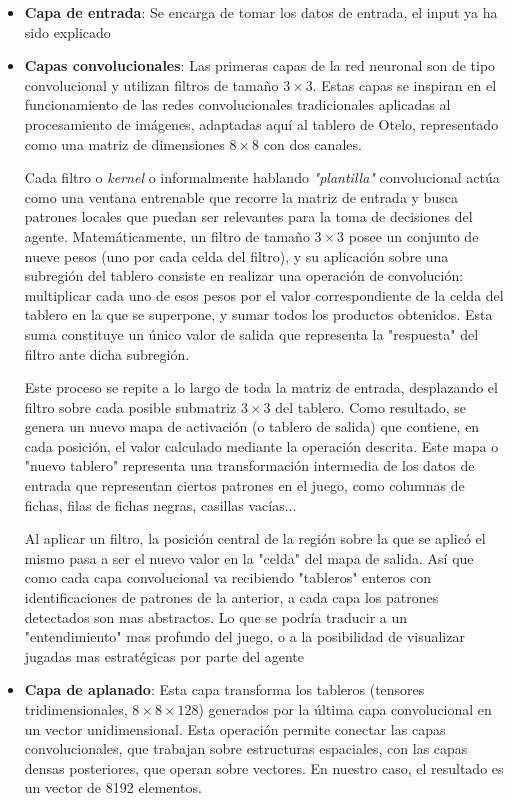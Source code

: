 \documentclass[conference]{IEEEtran}
\begin{document}
\begin{itemize}
    \item \textbf{Capa de entrada}: Se encarga de tomar los datos de entrada, el input ya ha sido explicado 
    \item \textbf{Capas convolucionales}: Las primeras capas de la red neuronal son de tipo convolucional y utilizan filtros de tamaño $3 \times 3$. Estas capas se inspiran en el funcionamiento de las redes convolucionales tradicionales aplicadas al procesamiento de imágenes, adaptadas aquí al tablero de Otelo, representado como una matriz de dimensiones $8 \times 8$ con dos canales.

Cada filtro o \textit{kernel} o informalmente hablando \textit{"plantilla"} convolucional actúa como una ventana entrenable que recorre la matriz de entrada y busca patrones locales que puedan ser relevantes para la toma de decisiones del agente. Matemáticamente, un filtro de tamaño $3 \times 3$ posee un conjunto de nueve pesos (uno por cada celda del filtro), y su aplicación sobre una subregión del tablero consiste en realizar una operación de convolución: multiplicar cada uno de esos pesos por el valor correspondiente de la celda del tablero en la que se superpone, y sumar todos los productos obtenidos. Esta suma constituye un único valor de salida que representa la "respuesta" del filtro ante dicha subregión.

Este proceso se repite a lo largo de toda la matriz de entrada, desplazando el filtro sobre cada posible submatriz $3 \times 3$ del tablero. Como resultado, se genera un nuevo mapa de activación (o tablero de salida) que contiene, en cada posición, el valor calculado mediante la operación descrita. Este mapa o "nuevo tablero" representa una transformación intermedia de los datos de entrada que representan ciertos patrones en el juego, como columnas de fichas, filas de fichas negras, casillas vacías...

 Al aplicar un filtro, la posición central de la región sobre la que se aplicó el mismo pasa a ser el nuevo valor en la "celda" del mapa de salida. Así que como cada capa convolucional va recibiendo "tableros" enteros con identificaciones de patrones de la anterior, a cada capa los patrones detectados son mas abstractos. Lo que se podría traducir a un "entendimiento" mas profundo del juego, o a la posibilidad de visualizar jugadas mas estratégicas por parte del agente
\item \textbf{Capa de aplanado}: Esta capa transforma los tableros (tensores tridimensionales, $8 \times 8 \times 128$) generados por la última capa convolucional en un vector unidimensional. Esta operación permite conectar las capas convolucionales, que trabajan sobre estructuras espaciales, con las capas densas posteriores, que operan sobre vectores. En nuestro caso, el resultado es un vector de 8192 elementos.


\end{itemize}
\end{document}
